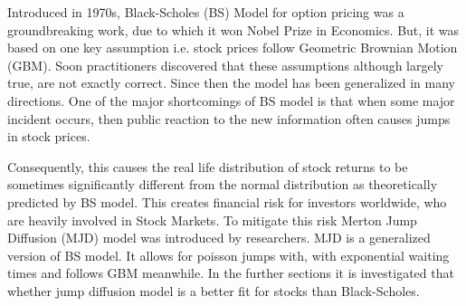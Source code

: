 \documentclass[paper.tex]{subfiles}
\begin{document}
    Introduced in 1970s, Black-Scholes (BS) Model for option pricing was a groundbreaking work, due to which it won Nobel Prize in Economics.
    But, it was based on one key assumption i.e. stock prices follow Geometric Brownian Motion (GBM).
    Soon practitioners discovered that these assumptions although largely true, are not exactly correct.
    Since then the model has been generalized in many directions.
    One of the major shortcomings of BS model is that when some major incident occurs, then public reaction to the new information often causes jumps in stock prices.
    
    Consequently, this causes the real life distribution of stock returns to be sometimes significantly different from the normal distribution as theoretically predicted by BS model.
    This creates financial risk for investors worldwide, who are heavily involved in Stock Markets.
    To mitigate this risk Merton Jump Diffusion (MJD) model was introduced by researchers.
    MJD is a generalized version of BS model. It allows for poisson jumps with, with exponential waiting times and follows GBM meanwhile.
    In the further sections it is investigated that whether jump diffusion model is a better fit for stocks than Black-Scholes.
\end{document}
